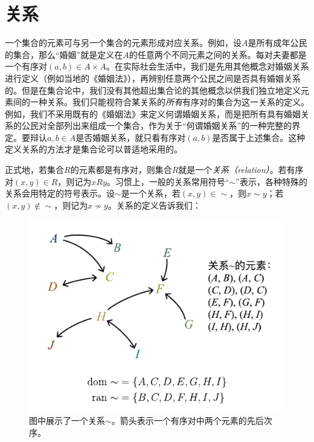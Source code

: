 \documentclass[../main.tex]{subfiles}
\begin{document}
\section{关系}
一个集合的元素可与另一个集合的元素形成对应关系。例如，设$A$是所有成年公民的集合，那么“婚姻”就是定义在$A$的任意两个不同元素之间的关系。每对夫妻都是一个有序对$\left(a,b\right)\in A\times A$。在实际社会生活中，我们是先用其他概念对婚姻关系进行定义（例如当地的《婚姻法》），再辨别任意两个公民之间是否具有婚姻关系的。但是在集合论中，我们没有其他超出集合论的其他概念以供我们独立地定义元素间的一种关系。我们只能视符合某关系的\emph{所有}有序对的集合为这一关系的定义。例如，我们不采用既有的《婚姻法》来定义何谓婚姻关系，而是把所有具有婚姻关系的公民对全部列出来组成一个集合，作为关于“何谓婚姻关系”的一种完整的界定。要辩认$a, b\in A$是否婚姻关系，就只看有序对$\left(a,b\right)$是否属于上述集合。这种定义关系的方法才是集合论可以普适地采用的。

正式地，若集合$R$的元素都是有序对，则集合$R$就是一个\emph{关系（relation）}。若有序对$\left(x,y\right)\in R$，则记为$xRy$。习惯上，一般的关系常用符号“$\sim$”表示，各种特殊的关系会用特定的符号表示。设$\sim$是一个关系，若$\left(x,y\right)\in \sim$，则$x\sim y$；若$\left(x,y\right)\notin\sim$，则记为$x\not\sim y$。关系的定义告诉我们：

\begin{figure}[htbp]
    \centering
    \includegraphics{../images/relation.pdf}
    \caption{图中展示了一个关系$\sim$。箭头表示一个有序对中两个元素的先后次序。}
    \label{fig:II.1.1}
\end{figure}
\end{document}
